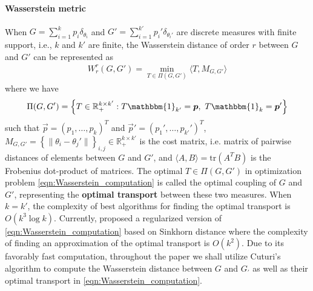 \paragraph{Wasserstein metric} \label{Section:Append_Wasserstein_metric}
When $G = \sum \limits_{i=1}^{k}{p_{i}\delta_{\theta_{i}}}$ and $G'=\sum  \limits_{i=1}^{k'}{p_{i}'\delta_{\theta_{i}'}}$ 
are discrete measures with finite support, i.e., $k$ and $k'$ are finite, 
the Wasserstein distance of order $r$ between $G$ and $G'$ can be represented as
\begin{eqnarray}
W_{r}^{r}(G,G') = \min \limits_{T \in \Pi(G,G')} \langle T,M_{G,G'} \rangle \label{eqn:Wasserstein_computation}
\end{eqnarray}
where we have
\begin{eqnarray}
\Pi(G,G') = \left\{T \in \mathbb{R}_{+}^{k \times k'}: T\mathbbm{1}_{k'}=\vec{p}, \ T\mathbbm{1}_{k}=\vec{p}'\right\} \nonumber
\end{eqnarray}
such that $\vec{p}=(p_{1},\ldots,p_{k})^{T}$ and $\vec{p}'=(p_{1}',\ldots,p_{k'}')^{T}$, 
$M_{G,G'} = \left\{\|\theta_{i}-\theta_{j}'\|\right\}_{i,j} \in \mathbb{R}_{+}^{k \times k'}
$ is the cost matrix, i.e. matrix of pairwise distances of elements between $G$ and $G'$, and 
$\langle A, B \rangle =  \text{tr}(A^{T}B)$ is the Frobenius dot-product of matrices. The 
optimal $T \in \Pi(G,G')$ in optimization problem \eqref{eqn:Wasserstein_computation} is called 
the optimal coupling of $G$ and $G'$, representing the \textbf{optimal transport} between these two measures. 
When $k=k'$, 
the complexity of best algorithms for finding the optimal transport is $O(k^{3}\log k)$. 
Currently, \cite{Cuturi-2013} proposed a regularized version of 
\eqref{eqn:Wasserstein_computation} based on Sinkhorn distance where the complexity of 
finding an approximation of the optimal transport is $O(k^{2})$. Due to its favorably
fast computation, throughout the paper we shall utilize Cuturi's algorithm to compute the Wasserstein 
distance between $G$ and $G_{'}$ as well as their optimal transport in 
\eqref{eqn:Wasserstein_computation}.
